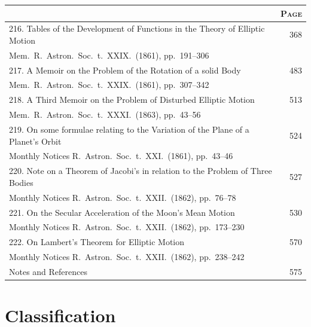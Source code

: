 \documentclass[12pt,a4paper]{article}
\theoremstyle{plain}
\begin{document}
\begin{longtable}{p{}r}
\toprule
\multicolumn{1}{c}{} & \multicolumn{1}{c}{\textsc{Page}} \\
\midrule
\endhead
216. Tables of the Development of Functions in the Theory of Elliptic Motion \dotfill & 368 \\
\multicolumn{2}{l}{\small Mem.\ R.\ Astron.\ Soc.\ t.~XXIX.\ (1861), pp.~191--306} \\[0.5em]
%
217. A Memoir on the Problem of the Rotation of a solid Body \dotfill & 483 \\
\multicolumn{2}{l}{\small Mem.\ R.\ Astron.\ Soc.\ t.~XXIX.\ (1861), pp.~307--342} \\[0.5em]
%
218. A Third Memoir on the Problem of Disturbed Elliptic Motion \dotfill & 513 \\
\multicolumn{2}{l}{\small Mem.\ R.\ Astron.\ Soc.\ t.~XXXI.\ (1863), pp.~43--56} \\[0.5em]
%
219. On some formulae relating to the Variation of the Plane of a Planet's Orbit \dotfill & 524 \\
\multicolumn{2}{l}{\small Monthly Notices R.\ Astron.\ Soc.\ t.~XXI.\ (1861), pp.~43--46} \\[0.5em]
%
220. Note on a Theorem of Jacobi's in relation to the Problem of Three Bodies \dotfill & 527 \\
\multicolumn{2}{l}{\small Monthly Notices R.\ Astron.\ Soc.\ t.~XXII.\ (1862), pp.~76--78} \\[0.5em]
%
221. On the Secular Acceleration of the Moon's Mean Motion \dotfill & 530 \\
\multicolumn{2}{l}{\small Monthly Notices R.\ Astron.\ Soc.\ t.~XXII.\ (1862), pp.~173--230} \\[0.5em]
%
222. On Lambert's Theorem for Elliptic Motion \dotfill & 570 \\
\multicolumn{2}{l}{\small Monthly Notices R.\ Astron.\ Soc.\ t.~XXII.\ (1862), pp.~238--242} \\[0.5em]
%
Notes and References \dotfill & 575 \\
\bottomrule
\end{longtable}

\clearpage

\section*{Classification}
\end{document}
